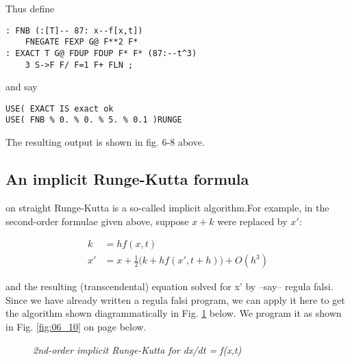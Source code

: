 Thus define

\begin{lstlisting}
: FNB (:[T]-- 87: x--f[x,t])
    FNEGATE FEXP G@ F**2 F*
: EXACT T G@ FDUP FDUP F* F* (87:--t^3)
    3 S->F F/ F=1 F+ FLN ;
\end{lstlisting}

and say

\begin{lstlisting}
USE( EXACT IS exact ok
USE( FNB % 0. % 0. % 5. % 0.1 )RUNGE
\end{lstlisting}

The resulting output is shown in fig. 6-8 above.

\subsection{An implicit Runge-Kutta formula}
 on straight Runge-Kutta is a so-called implicit algorithm.For example, in the second-order formulae given above, suppose $x + k$ were replaced by $x'$:

\begin{equation}
\begin{aligned}
    k &= hf(x,t)\\
    x' &= x + \frac{1}{2}\big(k + hf(x',t+h)\big) + O(h^3)
    \label{eq:06_23} 
\end{aligned}
\end{equation}

and the resulting (transcendental) equation solved for x' by --say-- regula falsi. Since we have already written a regula falsi program, we can apply it here to get the algorithm shown diagrammatically in Fig. \ref{fig:06_09} below. We program it as shown in Fig. \ref{fig:06_10} on page \pageref{fig:06_10} below.

\begin{figure}
    \caption{\textit{2nd-order implicit Runge-Kutta for dx/dt = f(x,t)}}
    \label{fig:06_09}
\end{figure}


